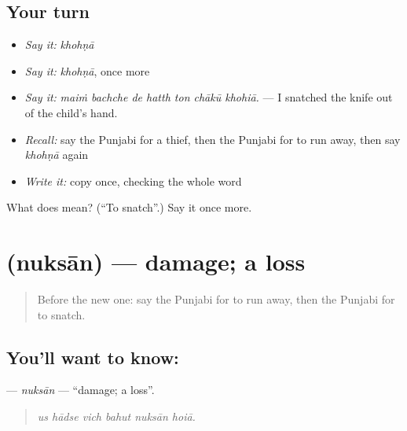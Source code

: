 \subsection*{Your turn}
\begin{itemize}
\raggedright
  \item \emph{Say it:} \emph{khohṇā}
  \item \emph{Say it:} \emph{khohṇā}, once more
  \item \emph{Say it:} \emph{maiṁ bachche de hatth ton chākū khohiā.} — I snatched the knife out of the child's hand.
  \item \emph{Recall:} say the Punjabi for a thief, then the Punjabi for to run away, then say \emph{khohṇā} again
  \item \emph{Write it:} copy \textbf{} once, checking the whole word
\end{itemize}

\begin{tcolorbox}[breakable,colback=teal!4,colframe=teal!35!black,title={Before you move on}]
What does  mean? (\textquotedblleft{}To snatch\textquotedblright{}.) Say it once more.
\end{tcolorbox}
\section[\texorpdfstring{\pa{ਨੁਕਸਾਨ} (nuksān)}{ਨੁਕਸਾਨ (nuksān)}]{ (nuksān) — damage; a loss}

\label{lesson:PA-C311-nuksan}



\begin{quote}
Before the new one: say the Punjabi for to run away, then the Punjabi for to snatch.
\end{quote}

\subsection*{You'll want to know: }
\textbf{} — \emph{nuksān} — \textquotedblleft{}damage; a loss\textquotedblright{}.

\begin{quote}
     
\end{quote}

\begin{quote}
\emph{us hādse vich bahut nuksān hoiā.}
\end{quote}

